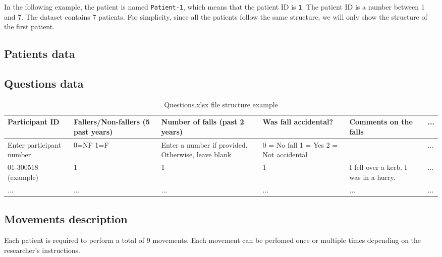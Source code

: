     In the following example, the patient is named \texttt{Patient-1}, which means that 
    the patient ID is \texttt{1}. The patient ID is a number between 1 and 7. The dataset
    contains 7 patients. For simplicity, since all the patients follow the same structure,
    we will only show the structure of the first patient.
    
    \subsection{Patients data}

    \subsection{Questions data}
      
        \begin{table}[htbp]
            \centering
            \begin{tabular}{|p{2.5cm}|p{2.5cm}|p{2.5cm}|p{2.5cm}|p{2.5cm}|p{.5cm}|}
                \hline
                \textbf{Participant ID} & \textbf{Fallers/Non-fallers (5 past years)} & \textbf{Number of falls (past 2 years)} & \textbf{Was fall accidental?} & \textbf{Comments on the falls} & ... \\
                \hline
                Enter participant number & 0=NF 1=F & Enter a number if provided. Otherwise, leave blank & 0 = No fall 1 = Yes 2 = Not accidental &  & ... \\
                \hline
                01-300518 (example) & 1 & 1 & 1 & I fell over a kerb. I was in a hurry. & ... \\
                \hline
                ... & ... & ... & ... & ... & ... \\
                \hline
            \end{tabular}

            \caption{Questions.xlsx file structure example}
        \end{table}
    \subsection{Movements description}
        Each patient is required to perform a total of 9 movements. Each movement can be 
        perfomed once or multiple times depending on the researcher's instructions. 
        

